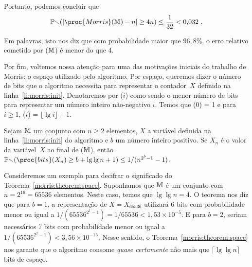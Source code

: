 Portanto, podemos concluir que 
\begin{align}
  \Pbb(|\proc{Morris}(\Mbb) - n| \geq 4n) \leq \frac{1}{32} < 0{,}032 \ .  \label{morris:error:result}
\end{align}

Em palavras, isto nos diz que com probabilidade maior que $96{,}8\%$, o erro relativo cometido por ($\mathbb{M}$) 
é menor do que 4.

Por fim, voltemos nossa atenção para uma das motivações iniciais do trabalho de Morris: o espaço utilizado pelo 
algoritmo. Por espaço, queremos dizer o número de bits que o algoritmo  necessita para representar o 
contador~$X$ definido na linha~\ref{li:morris:init}. Denotaremos por ($i$) como sendo o menor número de bits
para representar um número inteiro não-negativo $i$. Temos que (0) = 1 e para $i \geq 1$, ($i$) = 
$\lfloor\lg i\rfloor + 1$.

\begin{theorem}
  \label{morris:theorem:space}
  Sejam $\mathbb{M}$ um conjunto com $n \geq 2$ elementos, $X$ a variável definida na linha~\ref{li:morris:init} do algoritmo
   e $b$ um número inteiro positivo. Se $X_n$ é o valor da variável~$X$ ao final de ($\mathbb{M}$), 
  então $\Pbb(\proc{bits}(X_n) \geq b + \lg\lg n + 1) \leq 1/(n^{2^b-1}-1)$.
\end{theorem}

Consideremos um exemplo para decifrar o significado do Teorema~\ref{morris:theorem:space}. Suponhamos que $\mathbb{M}$ é um 
conjunto com $n = 2^{16} = 65536$ elementos. Neste caso, temos que $\lg \lg n = 4$. O teorema nos diz que para $b = 1$,
a representação de $X = X_{65536}$ utilizará 6 bits com probabilidade menor ou igual a 
$1/(65536^{2^1 - 1}) = 1/65536 < 1{,}53 \times 10^{-5}$. E para $b = 2$, seriam necessários 7 bits com probabilidade 
menor ou igual a $1/(65536^{2^2 - 1}) < 3{,}56 \times 10^{-15}$. Nesse sentido, o Teorema~\ref{morris:theorem:space} nos 
garante que o algoritmo  consome \textit{quase certamente} não mais que $\lceil\lg \lg n\rceil$ bits de 
espaço.

